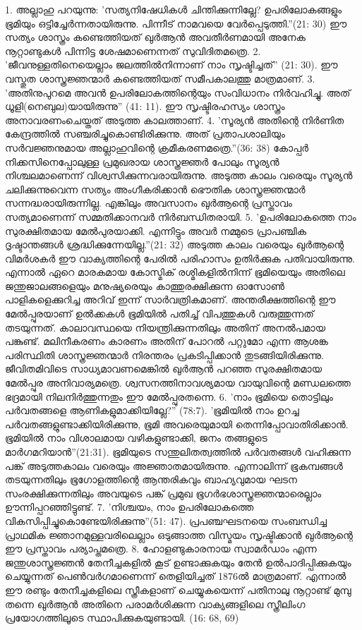1. അല്ലാഹു പറയുന്നു: 'സത്യനിഷേധികള്‍ ചിന്തിക്കുന്നില്ലേ? ഉപരിലോകങ്ങളും ഭൂമിയും ഒട്ടിച്ചേര്‍ന്നതായിരുന്നു. പിന്നീട് നാമവയെ വേര്‍പ്പെടുത്തി.''(21: 30)
ഈ സത്യം ശാസ്ത്രം കണ്ടെത്തിയത് ഖുര്‍ആന്‍ അവതീര്‍ണമായി അനേക നൂറ്റാണ്ടുകള്‍ പിന്നിട്ട ശേഷമാണെന്നത് സുവിദിതമത്രെ.
2. 'ജീവനുള്ളതിനെയെല്ലാം ജലത്തില്‍നിന്നാണ് നാം സൃഷ്ടിച്ചത്'' (21: 30). ഈ വസ്തുത ശാസ്ത്രജ്ഞന്മാര്‍ കണ്ടെത്തിയത് സമീപകാലത്തു മാത്രമാണ്.
3. 'അതിനുപുറമെ അവന്‍ ഉപരിലോകത്തിന്റെയും സംവിധാനം നിര്‍വഹിച്ചു. അത് ധൂളി(നെബുല)യായിരുന്നു'' (41: 11). ഈ സൃഷ്ടിരഹസ്യം ശാസ്ത്രം അനാവരണംചെയ്തത് അടുത്ത കാലത്താണ്.
4. 'സൂര്യന്‍ അതിന്റെ നിര്‍ണിത കേന്ദ്രത്തില്‍ സഞ്ചരിച്ചുകൊണ്ടിരിക്കുന്നു. അത് പ്രതാപശാലിയും സര്‍വജ്ഞനുമായ അല്ലാഹുവിന്റെ ക്രമീകരണമത്രെ.''(36: 38)
കോപ്പര്‍ നിക്കസിനെപ്പോലുള്ള പ്രമുഖരായ ശാസ്ത്രജ്ഞര്‍ പോലും സൂര്യന്‍ നിശ്ചലമാണെന്ന് വിശ്വസിക്കുന്നവരായിരുന്നു. അടുത്ത കാലം വരെയും സൂര്യന്‍ ചലിക്കുന്നുവെന്ന സത്യം അംഗീകരിക്കാന്‍ ഭൌതിക ശാസ്ത്രജ്ഞന്മാര്‍ സന്നദ്ധരായിരുന്നില്ല. എങ്കിലും അവസാനം ഖുര്‍ആന്റെ പ്രസ്താവം സത്യമാണെന്ന് സമ്മതിക്കാനവര്‍ നിര്‍ബന്ധിതരായി.
5. 'ഉപരിലോകത്തെ നാം സുരക്ഷിതമായ മേല്‍പുരയാക്കി. എന്നിട്ടും അവര്‍ നമ്മുടെ പ്രാപഞ്ചിക ദൃഷ്ടാന്തങ്ങള്‍ ശ്രദ്ധിക്കുന്നേയില്ല.''(21: 32)
അടുത്ത കാലം വരെയും ഖുര്‍ആന്റെ വിമര്‍ശകര്‍ ഈ വാക്യത്തിന്റെ പേരില്‍ പരിഹാസം ഉതിര്‍ക്കുക പതിവായിരുന്നു. എന്നാല്‍ ഏറെ മാരകമായ കോസ്മിക് രശ്മികളില്‍നിന്ന് ഭൂമിയെയും അതിലെ ജന്തുജാലങ്ങളെയും മനുഷ്യരെയും കാത്തുരക്ഷിക്കുന്ന ഓസോണ്‍ പാളികളെക്കുറിച്ച അറിവ് ഇന്ന് സാര്‍വത്രികമാണ്. അന്തരീക്ഷത്തിന്റെ ഈ മേല്‍പ്പുരയാണ് ഉല്‍ക്കകള്‍ ഭൂമിയില്‍ പതിച്ച് വിപത്തുകള്‍ വരുത്തുന്നത് തടയുന്നത്. കാലാവസ്ഥയെ നിയന്ത്രിക്കുന്നതിലും അതിന് അനല്‍പമായ പങ്കുണ്ട്. മലിനീകരണം കാരണം അതിന് പോറല്‍ പറ്റുമോ എന്ന ആശങ്ക പരിസ്ഥിതി ശാസ്ത്രജ്ഞന്മാര്‍ നിരന്തരം പ്രകടിപ്പിക്കാന്‍ തുടങ്ങിയിരിക്കുന്നു. ജീവിതമിവിടെ സാധ്യമാവണമെങ്കില്‍ ഖുര്‍ആന്‍ പറഞ്ഞ സുരക്ഷിതമായ മേല്‍പ്പുര അനിവാര്യമത്രെ. ശ്വസനത്തിനാവശ്യമായ വായുവിന്റെ മണ്ഡലത്തെ ഭദ്രമായി നിലനിര്‍ത്തുന്നതും ഈ മേല്‍പ്പുരതന്നെ.
6. 'നാം ഭൂമിയെ തൊട്ടിലും പര്‍വതങ്ങളെ ആണികളുമാക്കിയില്ലേ?'' (78:7). 'ഭൂമിയില്‍ നാം ഉറച്ച പര്‍വതങ്ങളുണ്ടാക്കിയിരിക്കുന്നു, ഭൂമി അവരെയുമായി തെന്നിപ്പോവാതിരിക്കാന്‍. ഭൂമിയില്‍ നാം വിശാലമായ വഴികളുണ്ടാക്കി, ജനം തങ്ങളുടെ മാര്‍ഗമറിയാന്‍''(21:31).
ഭൂമിയുടെ സന്തുലിതത്വത്തില്‍ പര്‍വതങ്ങള്‍ വഹിക്കുന്ന പങ്ക് അടുത്തകാലം വരെയും അജ്ഞാതമായിരുന്നു. എന്നാലിന്ന് ഭൂകമ്പങ്ങള്‍ തടയുന്നതിലും ഭൂഗോളത്തിന്റെ ആന്തരികവും ബാഹ്യവുമായ ഘടന സംരക്ഷിക്കുന്നതിലും അവയുടെ പങ്ക് പ്രമുഖ ഭൂഗര്‍ഭശാസ്ത്രജ്ഞന്മാരെല്ലാം ഊന്നിപ്പറഞ്ഞിട്ടുണ്ട്.
7. 'നിശ്ചയം, നാം ഉപരിലോകത്തെ വികസിപ്പിച്ചുകൊണ്ടേയിരിക്കുന്നു''(51: 47). പ്രപഞ്ചഘടനയെ സംബന്ധിച്ച പ്രാഥമിക ജ്ഞാനമുള്ളവരിലെല്ലാം ഒടുങ്ങാത്ത വിസ്മയം സൃഷ്ടിക്കാന്‍ ഖുര്‍ആന്റെ ഈ പ്രസ്താവം പര്യാപ്തമത്രെ.
8. ഹോളണ്ടുകാരനായ സ്വാമര്‍ഡാം എന്ന ജന്തുശാസ്ത്രജ്ഞന്‍ തേനീച്ചകളില്‍ കൂട് ഉണ്ടാക്കുകയും തേന്‍ ഉല്‍പാദിപ്പിക്കുകയും ചെയ്യുന്നത് പെണ്‍വര്‍ഗമാണെന്ന് തെളിയിച്ചത് 1876ല്‍ മാത്രമാണ്. എന്നാല്‍ ഈ രണ്ടും തേനീച്ചകളിലെ സ്ത്രീകളാണ് ചെയ്യുകയെന്ന് പതിനാലു നൂറ്റാണ്ട് മുമ്പു തന്നെ ഖുര്‍ആന്‍ അതിനെ പരാമര്‍ശിക്കുന്ന വാക്യങ്ങളിലെ സ്ത്രീലിംഗ പ്രയോഗത്തിലൂടെ സ്ഥാപിക്കുകയുണ്ടായി. (16: 68, 69)
